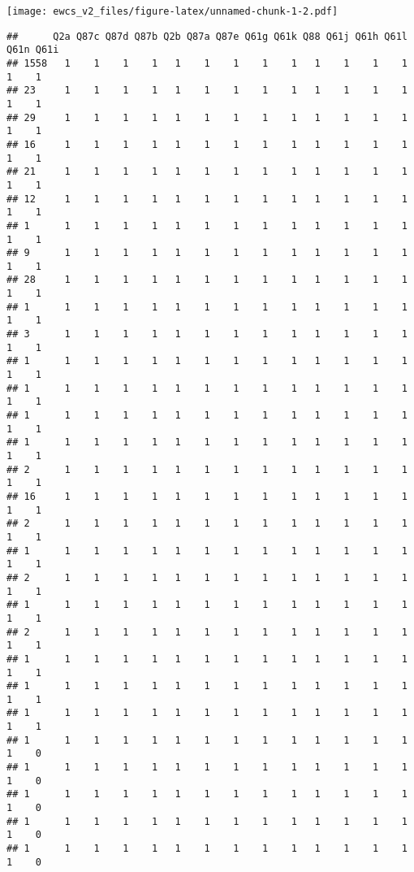 \documentclass[
]{article}
\begin{document}
\texttt{[image: ewcs\_v2\_files/figure-latex/unnamed-chunk-1-2.pdf]}

\begin{verbatim}
##      Q2a Q87c Q87d Q87b Q2b Q87a Q87e Q61g Q61k Q88 Q61j Q61h Q61l Q61n Q61i
## 1558   1    1    1    1   1    1    1    1    1   1    1    1    1    1    1
## 23     1    1    1    1   1    1    1    1    1   1    1    1    1    1    1
## 29     1    1    1    1   1    1    1    1    1   1    1    1    1    1    1
## 16     1    1    1    1   1    1    1    1    1   1    1    1    1    1    1
## 21     1    1    1    1   1    1    1    1    1   1    1    1    1    1    1
## 12     1    1    1    1   1    1    1    1    1   1    1    1    1    1    1
## 1      1    1    1    1   1    1    1    1    1   1    1    1    1    1    1
## 9      1    1    1    1   1    1    1    1    1   1    1    1    1    1    1
## 28     1    1    1    1   1    1    1    1    1   1    1    1    1    1    1
## 1      1    1    1    1   1    1    1    1    1   1    1    1    1    1    1
## 3      1    1    1    1   1    1    1    1    1   1    1    1    1    1    1
## 1      1    1    1    1   1    1    1    1    1   1    1    1    1    1    1
## 1      1    1    1    1   1    1    1    1    1   1    1    1    1    1    1
## 1      1    1    1    1   1    1    1    1    1   1    1    1    1    1    1
## 1      1    1    1    1   1    1    1    1    1   1    1    1    1    1    1
## 2      1    1    1    1   1    1    1    1    1   1    1    1    1    1    1
## 16     1    1    1    1   1    1    1    1    1   1    1    1    1    1    1
## 2      1    1    1    1   1    1    1    1    1   1    1    1    1    1    1
## 1      1    1    1    1   1    1    1    1    1   1    1    1    1    1    1
## 2      1    1    1    1   1    1    1    1    1   1    1    1    1    1    1
## 1      1    1    1    1   1    1    1    1    1   1    1    1    1    1    1
## 2      1    1    1    1   1    1    1    1    1   1    1    1    1    1    1
## 1      1    1    1    1   1    1    1    1    1   1    1    1    1    1    1
## 1      1    1    1    1   1    1    1    1    1   1    1    1    1    1    1
## 1      1    1    1    1   1    1    1    1    1   1    1    1    1    1    1
## 1      1    1    1    1   1    1    1    1    1   1    1    1    1    1    0
## 1      1    1    1    1   1    1    1    1    1   1    1    1    1    1    0
## 1      1    1    1    1   1    1    1    1    1   1    1    1    1    1    0
## 1      1    1    1    1   1    1    1    1    1   1    1    1    1    1    0
## 1      1    1    1    1   1    1    1    1    1   1    1    1    1    1    0

\end{verbatim}
\end{document}
